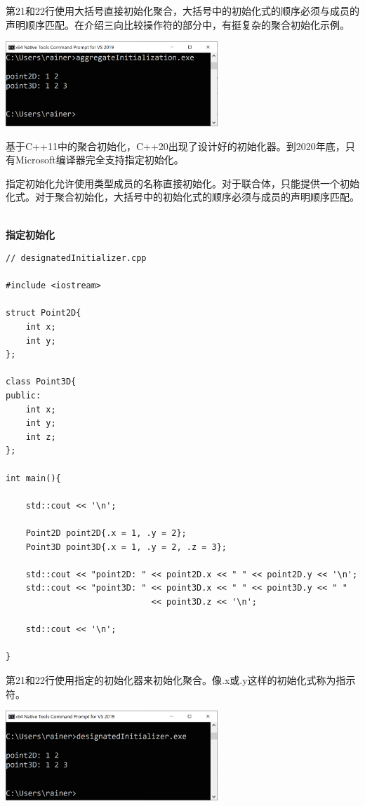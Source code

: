 第21和22行使用大括号直接初始化聚合，大括号中的初始化式的顺序必须与成员的声明顺序匹配。在介绍三向比较操作符的部分中，有挺复杂的聚合初始化示例。

\begin{center}
\includegraphics[width=0.6\textwidth]{content/3/chapter4/images/32.png}\\
\end{center}

基于C++11中的聚合初始化，C++20出现了设计好的初始化器。到2020年底，只有Microsoft编译器完全支持指定初始化。


指定初始化允许使用类型成员的名称直接初始化。对于联合体，只能提供一个初始化式。对于聚合初始化，大括号中的初始化式的顺序必须与成员的声明顺序匹配。

\hspace*{\fill} \\ %
\noindent
\textbf{指定初始化}
\begin{lstlisting}[style=styleCXX]
// designatedInitializer.cpp

#include <iostream>

struct Point2D{
	int x;
	int y;
};

class Point3D{
public:
	int x;
	int y;
	int z;
};

int main(){
	
	std::cout << '\n';
	
	Point2D point2D{.x = 1, .y = 2};
	Point3D point3D{.x = 1, .y = 2, .z = 3};
	
	std::cout << "point2D: " << point2D.x << " " << point2D.y << '\n';
	std::cout << "point3D: " << point3D.x << " " << point3D.y << " "
							 << point3D.z << '\n';
	
	std::cout << '\n';
	
}
\end{lstlisting}

第21和22行使用指定的初始化器来初始化聚合。像.x或.y这样的初始化式称为指示符。

\begin{center}
\includegraphics[width=0.6\textwidth]{content/3/chapter4/images/33.png}\\
\end{center}

